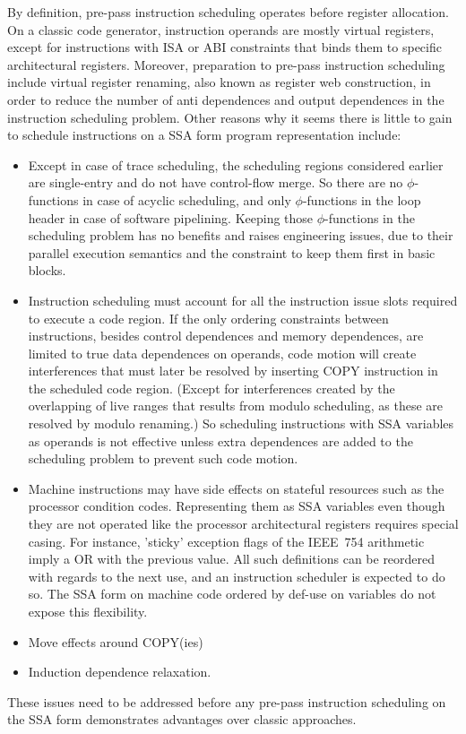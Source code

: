 By definition, pre-pass instruction scheduling operates before register
allocation. On a classic code generator, instruction operands are mostly virtual
registers, except for instructions with ISA or ABI constraints that binds them
to specific architectural registers. Moreover, preparation to pre-pass
instruction scheduling include virtual register renaming, also known as register
web construction, in order to reduce the number of anti dependences and output
dependences in the instruction scheduling problem. Other reasons why it seems
there is little to gain to schedule instructions on a SSA form program
representation include: \begin{itemize}

\item Except in case of trace scheduling, the scheduling regions considered
earlier are single-entry and do not have control-flow merge. So there are no
$\phi$-functions in case of acyclic scheduling, and only $\phi$-functions in the
loop header in case of software pipelining. Keeping those $\phi$-functions in
the scheduling problem has no benefits and raises engineering issues, due to
their parallel execution semantics and the constraint to keep them first in
basic blocks.

\item Instruction scheduling must account for all the instruction issue slots
required to execute a code region. If the only ordering constraints between
instructions, besides control dependences and memory dependences, are limited to
true data dependences on operands, code motion will create interferences that
must later be resolved by inserting COPY instruction in the scheduled code
region. (Except for interferences created by the overlapping of live ranges
that results from modulo scheduling, as these are resolved by modulo renaming.)
So scheduling instructions with SSA variables as operands is not effective
unless extra dependences are added to the scheduling problem to prevent such
code motion. 

\item Machine instructions may have side effects on stateful resources such as
the processor condition codes. Representing them as SSA variables even though
they are not operated like the processor architectural registers requires
special casing. For instance, 'sticky' exception flags of the IEEE~754
arithmetic imply a OR with the previous value. All such definitions can be
reordered with regards to the next use, and an instruction scheduler is expected
to do so. The SSA form on machine code ordered by def-use on variables
do not expose this flexibility.

\item Move effects around COPY(ies) \cite{Young:1998:MICRO}

\item Induction dependence relaxation.

\end{itemize} These issues need to be addressed before any pre-pass instruction
scheduling on the SSA form demonstrates advantages over classic approaches.

